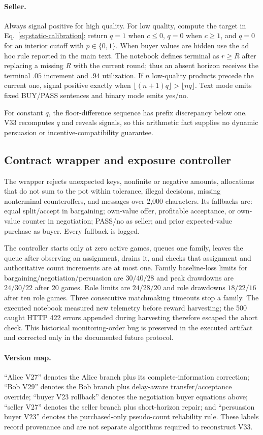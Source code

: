 \paragraph{Seller.}
Always signal positive for high quality. For low quality, compute the target in
Eq.~\ref{eq:static-calibration}; return $q=1$ when $c\le0$, $q=0$ when $c\ge1$,
and $q=0$ for an interior cutoff with $p\in\{0,1\}$. When buyer values are
hidden use the ad hoc rule reported in the main text. The notebook defines
terminal as $r\ge R$ after replacing a missing $R$ with the current round; thus
an absent horizon receives the terminal $.05$ increment and $.94$ utilization.
If $n$ low-quality products precede the current one, signal positive exactly
when $\lfloor(n+1)q\rfloor>\lfloor nq\rfloor$. Text mode emits fixed BUY/PASS
sentences and binary mode emits yes/no.

For constant $q$, the floor-difference sequence has prefix discrepancy below
one. V33 recomputes $q$ and reveals signals, so this arithmetic fact supplies no
dynamic persuasion or incentive-compatibility guarantee.

\subsection{Contract wrapper and exposure controller}

The wrapper rejects unexpected keys, nonfinite or negative amounts, allocations
that do not sum to the pot within tolerance, illegal decisions, missing
nonterminal counteroffers, and messages over 2,000 characters. Its fallbacks
are: equal split/accept in bargaining; own-value offer, profitable acceptance,
or own-value counter in negotiation; PASS/no as seller; and prior expected-value
purchase as buyer. Every fallback is logged.

The controller starts only at zero active games, queues one family, leaves the
queue after observing an assignment, drains it, and checks that assignment and
authoritative count increments are at most one. Family baseline-loss limits for
bargaining/negotiation/persuasion are $30/40/28$ and peak drawdowns are
$24/30/22$ after 20 games. Role limits are $24/28/20$ and role drawdowns
$18/22/16$ after ten role games. Three consecutive matchmaking timeouts stop a
family. The executed notebook measured new telemetry before reward harvesting;
the 500 caught HTTP 422 errors appended during harvesting therefore escaped the
abort check. This historical monitoring-order bug is preserved in the executed
artifact and corrected only in the documented future protocol.

\paragraph{Version map.}
``Alice V27'' denotes the Alice branch plus its complete-information correction;
``Bob V29'' denotes the Bob branch plus delay-aware transfer/acceptance override;
``buyer V23 rollback'' denotes the negotiation buyer equations above;
``seller V27'' denotes the seller branch plus short-horizon repair; and
``persuasion buyer V23'' denotes the purchased-only pseudo-count reliability rule.
These labels record provenance and are not separate algorithms required to
reconstruct V33.
